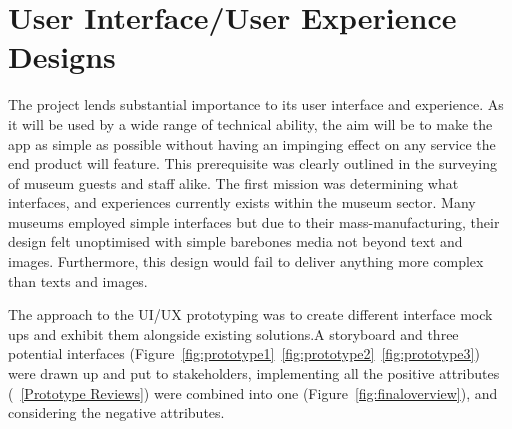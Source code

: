\section{User Interface/User Experience Designs}
The project lends substantial importance to its user interface and experience. As it will be used by a wide range of technical ability, the aim will be to make the app as simple as possible without having an impinging effect on any service the end product will feature. This prerequisite was clearly outlined in the surveying of museum guests and staff alike. The first mission was determining what interfaces, and experiences currently exists within the museum sector. Many museums employed simple interfaces but due to their mass-manufacturing, their design felt unoptimised with simple barebones media not beyond text and images. Furthermore, this design would fail to deliver anything more complex than texts and images.
  
The approach to the UI/UX prototyping was to create different interface mock ups and exhibit them alongside existing solutions.A storyboard and three potential interfaces (Figure~\ref{fig:prototype1}~\ref{fig:prototype2}~\ref{fig:prototype3}) were drawn up and put to stakeholders, implementing all the positive attributes (~\ref{Prototype Reviews}) were combined into one (Figure~\ref{fig:finaloverview}), and considering the negative attributes.